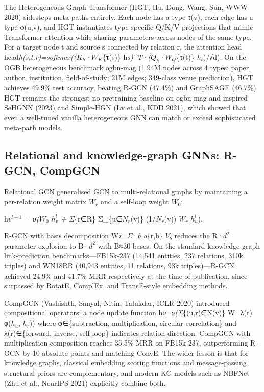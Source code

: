 \documentclass{article}
\begin{document}
The Heterogeneous Graph Transformer (HGT, Hu, Dong, Wang, Sun, WWW 2020) sidesteps meta-paths entirely. Each node has a type τ(v), each edge has a type φ(u,v), and HGT instantiates type-specific Q/K/V projections that mimic Transformer attention while sharing parameters across nodes of the same type. For a target node t and source s connected by relation r, the attention head head\emph{h(s,t,r)=softmax((\(K_h\)·\(W_K\)}\{τ(s)\} h\emph{s)\^{}T·(\(Q_h\)·\(W_Q\)}\{τ(t)\} \(h_t\))/√d). On the OGB heterogeneous benchmark ogbn-mag (1.94M nodes across 4 types: paper, author, institution, field-of-study; 21M edges; 349-class venue prediction), HGT achieves 49.9\% test accuracy, beating R-GCN (47.4\%) and GraphSAGE (46.7\%). HGT remains the strongest no-pretraining baseline on ogbn-mag and inspired SeHGNN (2023) and Simple-HGN (Lv et al., KDD 2021), which showed that even a well-tuned vanilla heterogeneous GNN can match or exceed sophisticated meta-path models.

\subsection{Relational and knowledge-graph GNNs: R-GCN, CompGCN}\label{relational-and-knowledge-graph-gnns-r-gcn-compgcn}

Relational GCN \citep{schlichtkrull2018modelingrelational} generalised GCN to multi-relational graphs by maintaining a per-relation weight matrix \(W_r\) and a self-loop weight \(W_0\):

h\emph{\(v^{l+1}\) = σ(\(W_0\) \(h_v^l\) + Σ}\{r∈R\} Σ\_\{u∈\(N_r\)(v)\} (1/\textbar{}\(N_r\)(v)\textbar) \(W_r\) \(h_u^l\)).

R-GCN with basis decomposition W\emph{r=Σ\_b a}\{r,b\} \(V_b\) reduces the \textbar R\textbar·\(d^2\) parameter explosion to B·\(d^2\) with B≈30 bases. On the standard knowledge-graph link-prediction benchmarks---FB15k-237 (14,541 entities, 237 relations, 310k triples) and WN18RR (40,943 entities, 11 relations, 93k triples)---R-GCN achieved 24.9\% and 41.7\% MRR respectively at the time of publication, since surpassed by RotatE, ComplEx, and TransE-style embedding methods.

CompGCN (Vashishth, Sanyal, Nitin, Talukdar, ICLR 2020) introduced compositional operators: a node update function h\emph{v=σ(Σ}\{(u,r)∈N(v)\} W\_λ(r) φ(\(h_u\), \(h_r\))) where φ∈\{subtraction, multiplication, circular-correlation\} and λ(r)∈\{forward, inverse, self-loop\} indicates relation direction. CompGCN with multiplication composition reaches 35.5\% MRR on FB15k-237, outperforming R-GCN by 10 absolute points and matching ConvE. The wider lesson is that for knowledge graphs, classical embedding scoring functions and message-passing structural priors are complementary, and modern KG models such as NBFNet (Zhu et al., NeurIPS 2021) explicitly combine both.
\end{document}
